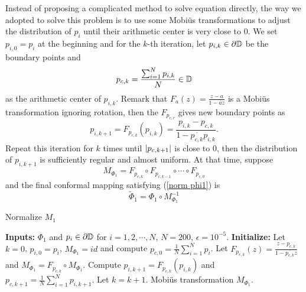 \documentclass[review,onefignum,onetabnum]{siamonline190516}
\begin{document}
    Instead of proposing a complicated method to solve equation directly, the way we adopted to solve this problem is to use some Mobi\"us transformations to adjust the distribution of $p_{i}$ until their arithmetic center is very close to 0. We set $p_{i,0} = p_{i}$ at the beginning and for the $k$-th iteration, let $p_{i,k} \in \partial \mathbb{D}$ be the boundary points and
    \begin{equation*}
        p_{c,k} = \frac{\sum_{i=1}^N p_{i,k}}{N} \in \mathbb{D}
    \end{equation*}
    as the arithmetic center of $p_{i,k}$. Remark that $F_a(z) = \frac{z-a}{1-\overline{a}z}$ is a Mobi\"us transformation ignoring rotation, then the $F_{p_{c,r}}$ gives new boundary points as 
    \begin{equation*}
        p_{i,k+1} = F_{p_{c,k}}(p_{i,k}) = \frac{p_{i,k} - p_{c,k}}{1 - \overline{p_{c,k}}p_{i,k}}.
    \end{equation*}
    Repeat this iteration for $k$ times until $\left\vert p_{c,k+1} \right\vert$ is close to $0$, then the distribution of $p_{i, k+1}$ is sufficiently regular and almost uniform. At that time, suppose 
    \begin{equation*}
        M_{\Phi_1} = F_{p_{c,k}} \circ F_{p_{c,k-1}} \circ \cdots \circ F_{p_{c, 0}}
    \end{equation*}
    and the final conformal mapping satisfying (\ref{norm phi1}) is
    \begin{equation}
        \tilde{\Phi}_1 = \Phi_1 \circ M_{\Phi_1}^{-1}
    \end{equation}

    \begin{algorithm}[H]
    \caption{Normalize $M_1$}
    \label{alg norm phi1}
    \begin{algorithmic}
        \STATE \textbf{Inputs:} $\Phi_1$ and $p_i \in \partial \mathbb{D}$ for $i=1, 2, \cdots, N$, $N=200$, $\epsilon=10^{-5}$.
        \STATE \textbf{Initialize:} Let $k=0$, $p_{i,0} = p_i$, $M_{\Phi_1} = id$ and compute $p_{c,0}= \frac{1}{N} \sum_{i=1}^N p_{i}$. %
            \STATE Let $F_{p_{c,k}}(z) = \frac{z-p_{c,k}}{1- \overline{p_{c, k}}z}$ and $M_{\Phi_1} = F_{p_{c,k}} \circ M_{\Phi_1}$.%
            \STATE Compute $p_{i, k+1} = F_{p_{c,k}}(p_{i, k})$ and $p_{c,k+1} = \frac{1}{N} \sum_{i=1}^N p_{i, k+1}$.
            \STATE Let $k = k+1$.
        \ENDWHILE
        \RETURN Mobi\"us transformation $M_{\Phi_1}$.
    \end{algorithmic}
    \end{algorithm}
\end{document}
